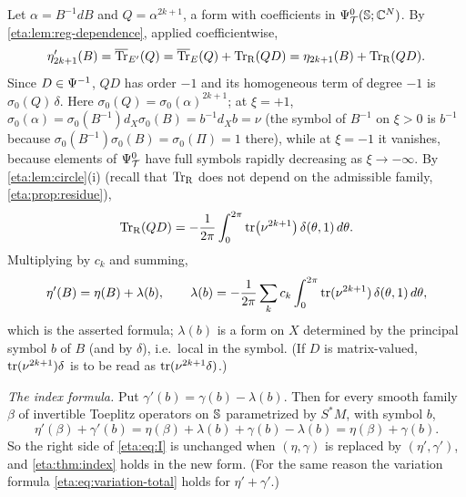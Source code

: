 Let $\alpha=B^{-1}dB$ and $Q=\alpha^{2k+1}$, a form with coefficients in
$\Psi^{0}_{\mathcal{T}}(\mathbb{S};\mathbb{C}^N)$. By \cref{eta:lem:reg-dependence}, applied coefficientwise,
\begin{equation*}
  \eta'_{2k+1}(B)=\overline{\operatorname{Tr}}_{E'}(Q)=\overline{\operatorname{Tr}}_E(Q)+\operatorname{Tr}_{\mathrm{R}}(QD)=\eta_{2k+1}(B)+\operatorname{Tr}_{\mathrm{R}}(QD).
\end{equation*}
Since $D\in\Psi^{-1}$, $QD$ has order $-1$ and its homogeneous term of degree $-1$
is $\sigma_0(Q)\,\delta$. Here $\sigma_0(Q)=\sigma_0(\alpha)^{2k+1}$; at $\xi=+1$,
$\sigma_0(\alpha)=\sigma_0(B^{-1})d_X\sigma_0(B)=b^{-1}d_Xb=\nu$ (the symbol of
$B^{-1}$ on $\xi>0$ is $b^{-1}$ because $\sigma_0(B^{-1})\sigma_0(B)=\sigma_0(\Pi)=1$
there), while at $\xi=-1$ it vanishes, because elements of $\Psi^{0}_{\mathcal{T}}$ have full
symbols rapidly decreasing as $\xi\to-\infty$. By \cref{eta:lem:circle}(i) (recall
that $\operatorname{Tr}_{\mathrm{R}}$ does not depend on the admissible family,
\cref{eta:prop:residue}),
\begin{equation*}
  \operatorname{Tr}_{\mathrm{R}}(QD)=-\frac1{2\pi}\int_0^{2\pi}\operatorname{tr}\bigl(\nu^{2k+1}\bigr)\,\delta(\theta,1)\,d\theta .
\end{equation*}
Multiplying by $c_k$ and summing,
\begin{equation*}
  \eta'(B)=\eta(B)+\lambda(b),\qquad
  \lambda(b)=-\frac1{2\pi}\sum_kc_k\int_0^{2\pi}\operatorname{tr}(\nu^{2k+1})\,\delta(\theta,1)\,d\theta,
\end{equation*}
which is the asserted formula; $\lambda(b)$ is a form on $X$ determined by the
principal symbol $b$ of $B$ (and by $\delta$), i.e.\ local in the symbol. (If $D$ is
matrix-valued, $\operatorname{tr}(\nu^{2k+1})\delta$ is to be read as $\operatorname{tr}(\nu^{2k+1}\delta)$.)

\emph{The index formula.} Put $\gamma'(b)=\gamma(b)-\lambda(b)$. Then for every
smooth family $\beta$ of invertible Toeplitz operators on $\mathbb{S}$ parametrized by
$S^*M$, with symbol $b$,
\begin{equation*}
  \eta'(\beta)+\gamma'(b)=\eta(\beta)+\lambda(b)+\gamma(b)-\lambda(b)=\eta(\beta)+\gamma(b).
\end{equation*}
So the right side of \eqref{eta:eq:I} is unchanged when $(\eta,\gamma)$ is replaced
by $(\eta',\gamma')$, and \cref{eta:thm:index} holds in the new form. (For the same
reason the variation formula \eqref{eta:eq:variation-total} holds for
$\eta'+\gamma'$.)

\subsection*{}

